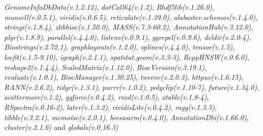 \documentclass[
]{book}
\begin{document}
\emph{GenomeInfoDbData(v.1.2.12)}, \emph{dotCall64(v.1.2)}, \emph{Rhdf5lib(v.1.26.0)}, \emph{munsell(v.0.5.1)}, \emph{viridis(v.0.6.5)}, \emph{reticulate(v.1.39.0)}, \emph{alabaster.schemas(v.1.4.0)}, \emph{stringi(v.1.8.4)}, \emph{zlibbioc(v.1.50.0)}, \emph{MASS(v.7.3-60.2)}, \emph{AnnotationHub(v.3.12.0)}, \emph{plyr(v.1.8.9)}, \emph{parallel(v.4.4.0)}, \emph{listenv(v.0.9.1)}, \emph{ggrepel(v.0.9.6)}, \emph{deldir(v.2.0-4)}, \emph{Biostrings(v.2.72.1)}, \emph{graphlayouts(v.1.2.0)}, \emph{splines(v.4.4.0)}, \emph{tensor(v.1.5)}, \emph{locfit(v.1.5-9.10)}, \emph{igraph(v.2.1.1)}, \emph{spatstat.geom(v.3.3-3)}, \emph{RcppHNSW(v.0.6.0)}, \emph{reshape2(v.1.4.4)}, \emph{ScaledMatrix(v.1.12.0)}, \emph{BiocVersion(v.3.19.1)}, \emph{evaluate(v.1.0.1)}, \emph{BiocManager(v.1.30.25)}, \emph{tweenr(v.2.0.3)}, \emph{httpuv(v.1.6.15)}, \emph{RANN(v.2.6.2)}, \emph{tidyr(v.1.3.1)}, \emph{purrr(v.1.0.2)}, \emph{polyclip(v.1.10-7)}, \emph{future(v.1.34.0)}, \emph{scattermore(v.1.2)}, \emph{ggforce(v.0.4.2)}, \emph{rsvd(v.1.0.5)}, \emph{xtable(v.1.8-4)}, \emph{RSpectra(v.0.16-2)}, \emph{later(v.1.3.2)}, \emph{viridisLite(v.0.4.2)}, \emph{ragg(v.1.3.3)}, \emph{tibble(v.3.2.1)}, \emph{memoise(v.2.0.1)}, \emph{beeswarm(v.0.4.0)}, \emph{AnnotationDbi(v.1.66.0)}, \emph{cluster(v.2.1.6)} and \emph{globals(v.0.16.3)}

  
\end{document}
